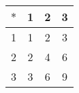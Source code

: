 \documentclass{article}
\begin{document}
\begin{tabular}{|c|c|c|c|}
  \hline
  $\ast$ & 1 & 2 & 3 \\\hline
     1   & 1 & 2 & 3 \\\hline
     2   & 2 & 4 & 6 \\\hline
     3   & 3 & 6 & 9 \\\hline
  \end{tabular}
\end{document}
